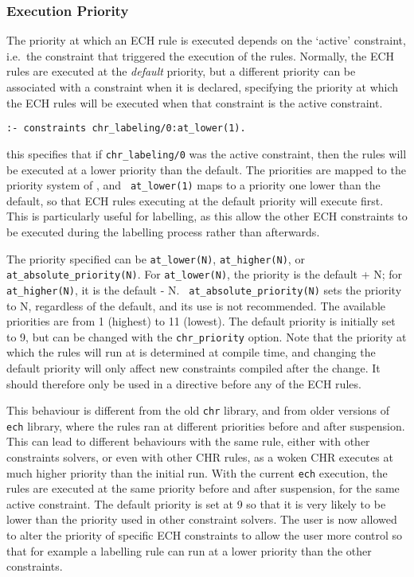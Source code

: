 \subsubsection{Execution Priority}

The priority at which an ECH rule is executed depends on the `active'
constraint, i.e.\ the constraint that triggered the execution of the
rules. Normally, the ECH rules are executed at the {\it default\/}
priority, but a different priority can be associated with a constraint when it
is declared, specifying the priority at which the ECH rules will be executed
when that constraint is the active constraint. 

\begin{verbatim}
:- constraints chr_labeling/0:at_lower(1).
\end{verbatim}

\noindent
this specifies that if {\tt chr_labeling/0} was the active constraint, then 
the rules will be executed at a lower priority than the default. The
priorities are mapped to the priority system of {\eclipse}, and {\tt
at_lower(1)} maps to a priority one lower than the default, so that ECH
rules executing at the default priority will execute first. This is
particularly useful for labelling, as this allow the other ECH constraints
to be executed during the labelling process rather than afterwards.

The priority specified can be {\tt at_lower(N)}, {\tt at_higher(N)}, or
{\tt at_absolute_priority(N)}. For {\tt at_lower(N)}, the priority is the
default + N; for {\tt at_higher(N)}, it is the default - N. {\tt
at_absolute_priority(N)} sets the priority to N, regardless of the default,
and its use is not recommended. The available priorities are from 1
(highest) to 11 (lowest). The default priority is initially set to 9, but
can be changed with the {\tt chr_priority} option. Note that the priority
at which the rules will run at is determined at compile time, and changing
the default priority will only affect new constraints compiled after the
change. It should therefore only be used in a directive before any of the
ECH rules.

This behaviour is different from the old {\tt chr} library, and from older
versions of {\tt ech} library, where the rules ran at different
priorities before and after suspension. This can lead to different
behaviours with the same rule, either with other constraints solvers, or
even with other CHR rules, as a woken CHR executes at much higher priority
than the initial run. With the current {\tt ech} execution, the rules are
executed at the same priority before and after suspension, for the same
active constraint. The default priority is set at 9 so that it is very
likely to be lower than the priority used in other constraint solvers. The
user is now allowed to alter the priority of specific ECH constraints to
allow the user more control so that for example a labelling rule can run at
a lower priority than the other constraints.

